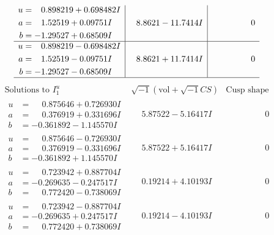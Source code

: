 \documentclass[1p]{elsarticle_modified}
\theoremstyle{definition}
\newcommand{\I}{\sqrt{-1}}
\begin{document}
$$\begin{array}{c|c|c}
\begin{aligned}
u &= \phantom{-}0.898219 + 0.698482 I \\
a &= \phantom{-}1.52519 + 0.09751 I \\
b &= -1.29527 + 0.68509 I\end{aligned}
 & \phantom{-}8.8621 - 11.7414 I & \phantom{-0.000000 } 0 \\ \hline\begin{aligned}
u &= \phantom{-}0.898219 - 0.698482 I \\
a &= \phantom{-}1.52519 - 0.09751 I \\
b &= -1.29527 - 0.68509 I\end{aligned}
 & \phantom{-}8.8621 + 11.7414 I & \phantom{-0.000000 } 0\\
 \hline 
 \end{array}$$\newpage$$\begin{array}{c|c|c}  
\text{Solutions to }I^u_{1}& \I (\text{vol} + \sqrt{-1}CS) & \text{Cusp shape}\\
 \hline 
\begin{aligned}
u &= \phantom{-}0.875646 + 0.726930 I \\
a &= \phantom{-}0.376919 + 0.331696 I \\
b &= -0.361892 - 1.145570 I\end{aligned}
 & \phantom{-}5.87522 - 5.16417 I & \phantom{-0.000000 } 0 \\ \hline\begin{aligned}
u &= \phantom{-}0.875646 - 0.726930 I \\
a &= \phantom{-}0.376919 - 0.331696 I \\
b &= -0.361892 + 1.145570 I\end{aligned}
 & \phantom{-}5.87522 + 5.16417 I & \phantom{-0.000000 } 0 \\ \hline\begin{aligned}
u &= \phantom{-}0.723942 + 0.887704 I \\
a &= -0.269635 - 0.247517 I \\
b &= \phantom{-}0.772420 - 0.738069 I\end{aligned}
 & \phantom{-}0.19214 + 4.10193 I & \phantom{-0.000000 } 0 \\ \hline\begin{aligned}
u &= \phantom{-}0.723942 - 0.887704 I \\
a &= -0.269635 + 0.247517 I \\
b &= \phantom{-}0.772420 + 0.738069 I\end{aligned}
 & \phantom{-}0.19214 - 4.10193 I & \phantom{-0.000000 } 0 \\ \hline\begin{aligned}

\end{aligned}
\end{array}$$
\end{document}
